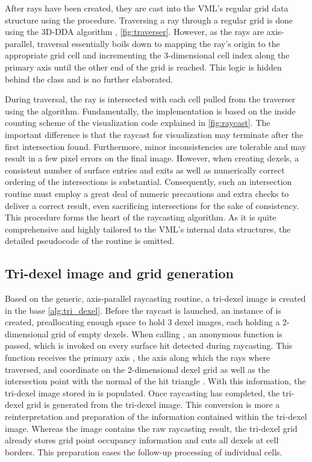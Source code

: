 After rays have been created, they are cast into the VML's regular grid data structure using the  procedure.
Traversing a ray through a regular grid is done using the 3D-DDA algorithm \cite{3DDDA}, \cf \cref{fig:traverser}.
However, as the rays are axis-parallel, traversal essentially boils down to mapping the ray's origin to the appropriate grid cell and incrementing the 3-dimensional cell index along the primary axis until the other end of the grid is reached.
This logic is hidden behind the  class and is no further elaborated.

During traversal, the ray is intersected with each cell pulled from the traverser using the  algorithm.
Fundamentally, the implementation is based on the inside counting scheme of the visualization code explained in \cref{fig:raycast}.
The important difference is that the raycast for visualization may terminate after the first intersection found.
Furthermore, minor inconsistencies are tolerable and may result in a few pixel errors on the final image.
However, when creating dexels, a consistent number of surface entries and exits as well as numerically correct ordering of the intersections is substantial.
Consequently, such an intersection routine must employ a great deal of numeric precautions and extra checks to deliver a correct result, even sacrificing intersections for the sake of consistency.
This procedure forms the heart of the raycasting algorithm.
As it is quite comprehensive and highly tailored to the VML's internal data structures, the detailed pseudocode of the  routine is omitted.


\subsection{Tri-dexel image and grid generation}
\label{sec:tri_dexel_dexel_image_generation}

Based on the generic, axis-parallel raycasting routine, a tri-dexel image is created in the base \cref{alg:tri_dexel}.
Before the raycast is launched, an instance of  is created, preallocating enough space to hold 3 dexel images, each holding a 2-dimensional grid of empty dexels.
When calling , an anonymous function is passed, which is invoked on every surface hit detected during raycasting.
This function receives the primary axis , \ie the axis along which the rays where traversed,  and  coordinate on the 2-dimensional dexel grid as well as the intersection point  with the normal of the hit triangle .
With this information, the tri-dexel image stored in  is populated.
Once raycasting has completed, the tri-dexel grid is generated from the tri-dexel image.
This conversion is more a reinterpretation and preparation of the information contained within the tri-dexel image.
Whereas the image contains the raw raycasting result, the tri-dexel grid already stores grid point occupancy information and cuts all dexels at cell borders.
This preparation eases the follow-up processing of individual cells.

